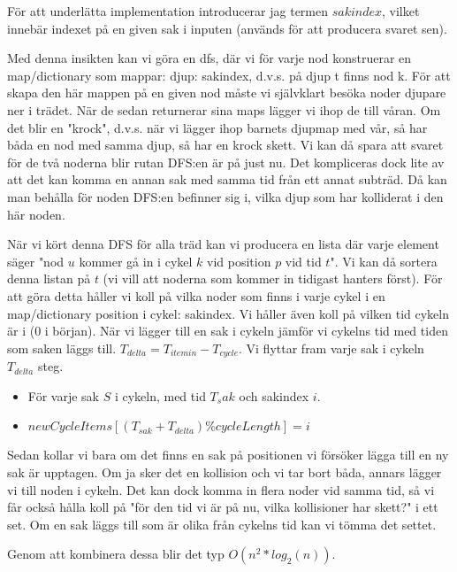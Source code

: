 \documentclass{article}
\begin{document}
För att underlätta implementation introducerar jag termen $sakindex$, vilket innebär indexet på en given sak i inputen (används för att producera svaret sen).
\begin{Träd}
Med denna insikten kan vi göra en dfs, där vi för varje nod konstruerar en map/dictionary som mappar: {djup: sakindex}, d.v.s. på djup t finns nod k. För att skapa den här mappen på en given nod måste vi självklart besöka noder djupare ner i trädet. När de sedan returnerar sina maps lägger vi ihop de till våran. Om det blir en "krock", d.v.s. när vi lägger ihop barnets djupmap med vår, så har båda en nod med samma djup, så har en krock skett. Vi kan då spara att svaret för de två noderna blir rutan DFS:en är på just nu. Det kompliceras dock lite av att det kan komma en annan sak med samma tid från ett annat subträd. Då kan man behålla för noden DFS:en befinner sig i, vilka djup som har kolliderat i den här noden. 
\end{Träd}

\begin{cycle}
När vi kört denna DFS för alla träd kan vi producera en lista där varje element säger "nod $u$ kommer gå in i cykel $k$ vid position $p$ vid tid $t$". Vi kan då sortera denna listan på $t$ (vi vill att noderna som kommer in tidigast hanters först). För att göra detta håller vi koll på vilka noder som finns i varje cykel i en map/dictionary {position i cykel: sakindex}. Vi håller även koll på vilken tid cykeln är i (0 i början). När vi lägger till en sak i cykeln jämför vi cykelns tid med tiden som saken läggs till. $T_{delta}=T_{itemin}-T_{cycle}$. Vi flyttar fram varje sak i cykeln $T_{delta}$ steg.
\begin{itemize}
              \item För varje sak $S$ i cykeln, med tid $T_sak$ och sakindex $i$.
              \item $newCycleItems[(T_{sak}+T_{delta})\%cycleLength]=i$
\end{itemize}
Sedan kollar vi bara om det finns en sak på positionen vi försöker lägga till en ny sak är upptagen. Om ja sker det en kollision och vi tar bort båda, annars lägger vi till noden i cykeln. Det kan dock komma in flera noder vid samma tid, så vi får också hålla koll på "för den tid vi är på nu, vilka kollisioner har skett?" i ett set. Om en sak läggs till som är olika från cykelns tid kan vi tömma det settet.

\end{cycle}

Genom att kombinera dessa blir det typ $O(n^2*log_2(n))$.
\end{document}
